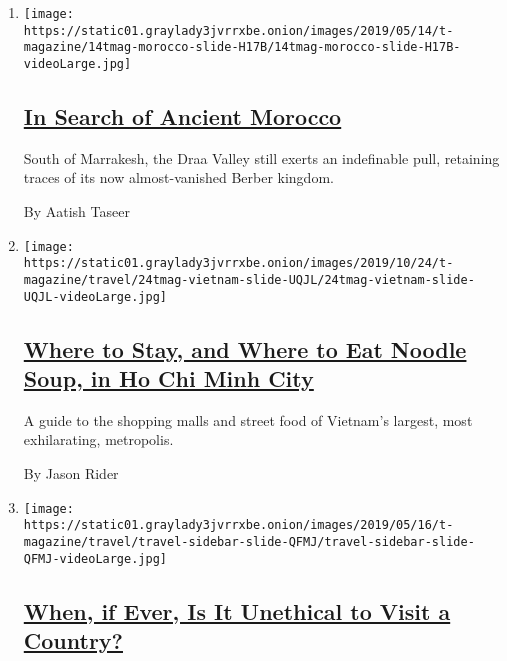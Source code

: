 \begin{enumerate}
\def\labelenumi{\arabic{enumi}.}
\item
  \texttt{[image: https://static01.graylady3jvrrxbe.onion/images/2019/05/14/t-magazine/14tmag-morocco-slide-H17B/14tmag-morocco-slide-H17B-videoLarge.jpg]}

  \hypertarget{in-search-of-ancient-morocco}{%
  \subsection{\texorpdfstring{\href{/2019/05/15/t-magazine/morocco-travel-draa-valley.html}{In
  Search of Ancient
  Morocco}}{In Search of Ancient Morocco}}\label{in-search-of-ancient-morocco}}

  South of Marrakesh, the Draa Valley still exerts an indefinable pull,
  retaining traces of its now almost-vanished Berber kingdom.

  By Aatish Taseer
\item
  \texttt{[image: https://static01.graylady3jvrrxbe.onion/images/2019/10/24/t-magazine/travel/24tmag-vietnam-slide-UQJL/24tmag-vietnam-slide-UQJL-videoLarge.jpg]}

  \hypertarget{where-to-stay-and-where-to-eat-noodle-soup-in-ho-chi-minh-city}{%
  \subsection{\texorpdfstring{\href{/2019/10/29/t-magazine/ho-chi-minh-city-travel-guide.html}{Where
  to Stay, and Where to Eat Noodle Soup, in Ho Chi Minh
  City}}{Where to Stay, and Where to Eat Noodle Soup, in Ho Chi Minh City}}\label{where-to-stay-and-where-to-eat-noodle-soup-in-ho-chi-minh-city}}

  A guide to the shopping malls and street food of Vietnam's largest,
  most exhilarating, metropolis.

  By Jason Rider
\item
  \texttt{[image: https://static01.graylady3jvrrxbe.onion/images/2019/05/16/t-magazine/travel/travel-sidebar-slide-QFMJ/travel-sidebar-slide-QFMJ-videoLarge.jpg]}

  \hypertarget{when-if-ever-is-it-unethical-to-visit-a-country}{%
  \subsection{\texorpdfstring{\href{/2019/05/16/t-magazine/ethical-travel-reporting.html}{When,
  if Ever, Is It Unethical to Visit a
  Country?}}{When, if Ever, Is It Unethical to Visit a Country?}}\label{when-if-ever-is-it-unethical-to-visit-a-country}}


\end{enumerate}
